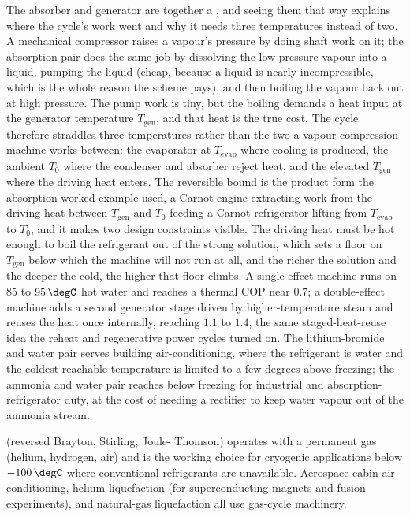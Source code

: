 The absorber and generator are together a , and
seeing them that way explains where the cycle's work went and why it needs three
temperatures instead of two. A mechanical compressor raises a vapour's pressure by
doing shaft work on it; the absorption pair does the same job by dissolving the
low-pressure vapour into a liquid, pumping the liquid (cheap, because a liquid is
nearly incompressible, which is the whole reason the scheme pays), and then boiling
the vapour back out at high pressure. The pump work is tiny, but the boiling
demands a heat input at the generator temperature $T_{\text{gen}}$, and that heat
is the true cost. The cycle therefore straddles three temperatures rather than the
two a vapour-compression machine works between: the evaporator at $T_{\text{evap}}$
where cooling is produced, the ambient $T_0$ where the condenser and absorber
reject heat, and the elevated $T_{\text{gen}}$ where the driving heat enters. The
reversible bound is the product form the absorption worked example used, a Carnot
engine extracting work from the driving heat between $T_{\text{gen}}$ and $T_0$
feeding a Carnot refrigerator lifting from $T_{\text{evap}}$ to $T_0$, and it makes
two design constraints visible. The driving heat must be hot enough to boil the
refrigerant out of the strong solution, which sets a floor on $T_{\text{gen}}$
below which the machine will not run at all, and the richer the solution and the
deeper the cold, the higher that floor climbs. A single-effect machine runs on
$85$ to $95\,\degC$ hot water and reaches a thermal COP near $0.7$; a double-effect
machine adds a second generator stage driven by higher-temperature steam and
reuses the heat once internally, reaching $1.1$ to $1.4$, the same
staged-heat-reuse idea the reheat and regenerative power cycles turned on. The
lithium-bromide and water pair serves building air-conditioning, where the
refrigerant is water and the coldest reachable temperature is limited to a few
degrees above freezing; the ammonia and water pair reaches below freezing for
industrial and absorption-refrigerator duty, at the cost of needing a rectifier to
keep water vapour out of the ammonia stream.

 (reversed Brayton, Stirling, Joule-
Thomson) operates with a permanent gas (helium, hydrogen, air) and
is the working choice for cryogenic applications below $-100\,\degC$
where conventional refrigerants are unavailable. Aerospace cabin air
conditioning, helium liquefaction (for superconducting magnets and
fusion experiments), and natural-gas liquefaction all use gas-cycle
machinery.

